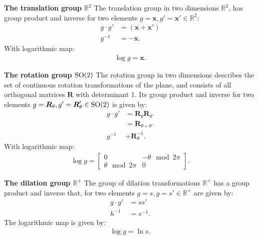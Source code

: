 \documentclass[nohyperref]{article}
\theoremstyle{plain}
\theoremstyle{definition}
\theoremstyle{remark}
\begin{document}
\textbf{The translation group $\mathbb{R}^2$}
The translation group in two dimensions $\mathbb{R}^2$, has group product and inverse for two elements $g=\boldsymbol{x},g'=\boldsymbol{x}' \in \mathbb{R}^2$:
\begin{align}
    g \cdot g' &= (\boldsymbol{x} + \boldsymbol{x}')\\
    g^{-1} &= -\boldsymbol{x}.
\end{align}
With logarithmic map:
\begin{align}
    \log g=\boldsymbol{x}.
\end{align}

\textbf{The rotation group ${\rm SO(2)}$}
The rotation group in two dimensions describes the set of continuous rotation transformations of the plane, and consists of all orthogonal matrices $\boldsymbol{R}$ with determinant 1. Its group product and inverse for two elements $g=\boldsymbol{R}_\theta, g'=\boldsymbol{R}_\theta' \in {\rm SO(2)}$ is given by:
\begin{align}
    g \cdot g' &= \boldsymbol{R}_\theta \boldsymbol{R}_{\theta'} \nonumber \\
    &= \boldsymbol{R}_{\theta + \theta'}\\
    g^{-1} &+ \boldsymbol{R}_\theta ^{-1}.
\end{align}
With logarithmic map:
\begin{align}
    \log g = \begin{bmatrix} 0 & -\theta\mod2\pi  \\ \theta\mod2\pi & 0   \end{bmatrix}.
\end{align}

\textbf{The dilation group ${\mathbb{R}^+}$}
The group of dilation transformations $\mathbb{R}^+$ has a group product and inverse that, for two elements $g=s, g=s' \in \mathbb{R}^+$ are given by:
\begin{align}
    g \cdot g' &= ss'\\
    h^{-1} &= s^{-1}.
\end{align}
The logarithmic map is given by:
\begin{align}
    \log g = \ln s.
\end{align}
\end{document}
